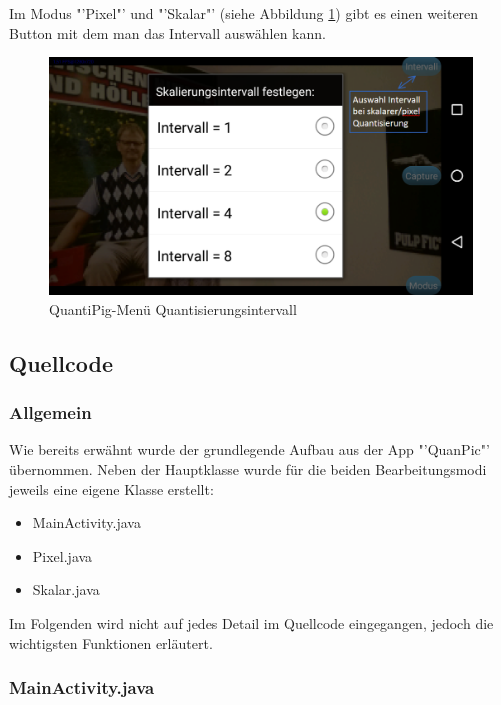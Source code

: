 \begin{description}
Im Modus "'Pixel"' und "'Skalar"' (siehe Abbildung \ref{fig:pig_intervall}) gibt es einen weiteren Button mit dem man das Intervall auswählen kann.

\begin{figure}[h!]
	\centering
		\includegraphics[width=1.0\textwidth]{img/Intervall_QuantiPig.png}
	\caption[QuantiPig-Menü Quantisierungsintervall]{QuantiPig-Menü Quantisierungsintervall}
	\label{fig:pig_intervall}
\end{figure}


\clearpage

\newpage
\subsection{Quellcode}
\subsubsection{Allgemein}

Wie bereits erwähnt wurde der grundlegende Aufbau aus der App "'QuanPic"' übernommen. Neben der Hauptklasse wurde für die beiden Bearbeitungsmodi jeweils eine eigene Klasse erstellt:
\begin{itemize}
	\item MainActivity.java
	\item Pixel.java
	\item Skalar.java
\end{itemize}
Im Folgenden wird nicht auf jedes Detail im Quellcode eingegangen, jedoch die wichtigsten Funktionen erläutert.

\subsubsection{MainActivity.java}
\label{mainactivity}


\end{description}
